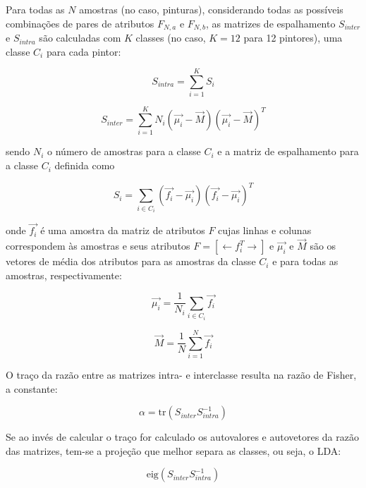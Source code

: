 Para todas as $N$ amostras (no caso, pinturas), considerando todas as possíveis
combinações de pares de atributos $F_{N, a}$ e $F_{N, b}$, as matrizes de
espalhamento $S_{inter}$ e $S_{intra}$ são calculadas com $K$ classes (no caso,
$K = 12$ para 12 pintores), uma classe $C_i$ para cada pintor:

\begin{equation}
S_{intra} = \sum_{i=1}^K S_i
\end{equation}

\begin{equation}
S_{inter} = \sum_{i=1}^K N_i(\vec{\mu_i} - \vec{M})(\vec{\mu_i} - \vec{M})^T
\end{equation}

\noindent sendo $N_i$ o número de amostras para a classe $C_i$ e a matriz de
espalhamento para a classe $C_i$ definida como

\begin{equation}
S_i = \sum_{i \in C_i} (\vec{f_i} - \vec{\mu_i})(\vec{f_i} - \vec{\mu_i})^T
\end{equation}

\noindent onde $\vec{f_i}$ é uma amostra da matriz de atributos $F$ cujas linhas
e colunas correspondem às amostras e seus atributos $F = \left[ \leftarrow
  f_i^T \rightarrow \right]$ e $\vec{\mu_i}$ e $\vec{M}$ são os vetores de média
dos atributos para as amostras da classe $C_i$ e para todas as amostras,
respectivamente:

\begin{equation} 
\vec{\mu_i} = \frac{1}{N_i} \sum_{i \in C_i} \vec{f_i}
\end{equation}

\begin{equation}
\vec{M} = \frac{1}{N} \sum_{i=1}^N \vec{f_i}
\end{equation}

O traço da razão entre as matrizes intra- e interclasse resulta na razão de
Fisher, a constante:

\begin{equation} \label{eq:alpha}
\alpha = \mathrm{tr}(S_{inter} S_{intra}^{-1})
\end{equation}

Se ao invés de calcular o traço for calculado os autovalores e autovetores da
razão das matrizes, tem-se a projeção que melhor separa as classes, ou seja, o LDA:

\begin{equation} \label{eq:lda}
\text{eig}(S_{inter} S_{intra}^{-1})
\end{equation}

